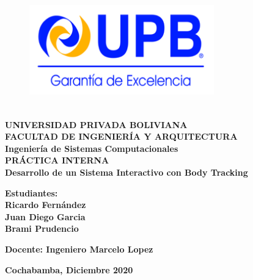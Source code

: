 \begin{titlepage}
	
	\makeatletter
	\setlength{\@fptop}{0pt}
	\makeatother
\begin{figure}[t!]
	\centering
	\includegraphics[width=8cm,height=5cm,]{./Images/Logo_Upb.png}
\end{figure}
\begin{center}
	\textbf{
		\large{UNIVERSIDAD PRIVADA BOLIVIANA\\
		FACULTAD DE INGENIERÍA Y ARQUITECTURA\\
		Ingeniería de Sistemas Computacionales\\[1cm]}
		\huge{PRÁCTICA INTERNA}\\[2cm]
		\Huge{Desarrollo de un Sistema Interactivo con Body Tracking}
	}\\[3cm]
\end{center} 
\textbf{Estudiantes: \\}
\textbf{
		Ricardo Fernández\\
		Juan Diego Garcia\\
		Brami Prudencio\\[1cm]
	}
\begin{center}
		\textbf{
		Docente:
		Ingeniero Marcelo Lopez\\[2cm]
	}
\end{center} 
	\begin{center}
		\textbf{Cochabamba, Diciembre 2020}
	\end{center}

\end{titlepage}